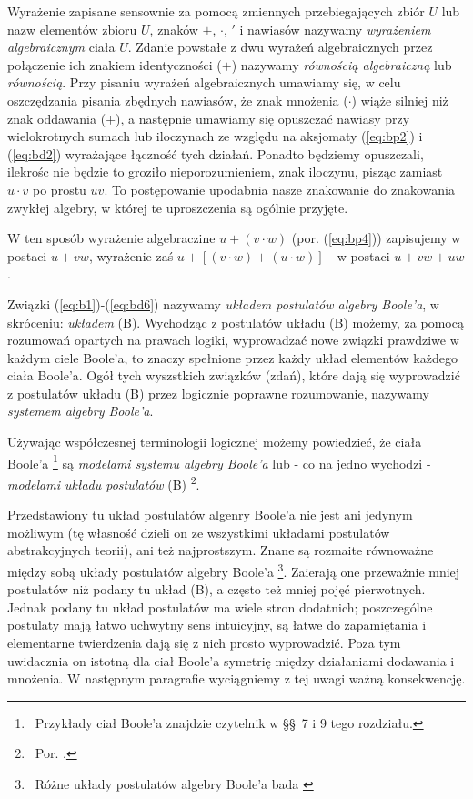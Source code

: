 \documentclass[12 pt, a4paper, leqno]{book}
\numberwithin{equation}{section}
\newcommand{\refb}[1]{(\ref{#1})}
\theoremstyle{twr}
\theoremstyle{twr}
\theoremstyle{eqtext}
\theoremstyle{okreslenie}
\begin{document}
Wyrażenie zapisane sensownie za pomocą zmiennych przebiegających zbiór $U$ lub nazw elementów zbioru $U$, znaków $+$, $\cdot$, 
$'$ i nawiasów nazywamy \textit{wyrażeniem algebraicznym} ciała $U$. Zdanie powstałe z dwu wyrażeń algebraicznych
przez połączenie ich znakiem identyczności ($+$) nazywamy \textit{równością algebraiczną} lub \textit{równością}.
Przy pisaniu wyrażeń algebraicznych umawiamy się, w celu oszczędzania pisania zbędnych nawiasów, 
że znak mnożenia ($\cdot$) wiąże silniej niż znak oddawania ($+$), a następnie umawiamy się opuszczać nawiasy 
przy wielokrotnych sumach lub iloczynach ze względu na aksjomaty \refb{eq:bp2} i \refb{eq:bd2} wyrażające łączność tych działań.
Ponadto będziemy opuszczali, ilekrośc nie będzie to groziło nieporozumieniem, znak iloczynu, pisząc zamiast $u \cdot v$
po prostu $uv$. To postępowanie upodabnia nasze znakowanie do znakowania zwykłej algebry, w której te uproszczenia 
są ogólnie przyjęte.

W ten sposób wyrażenie algebraczine $u +(v \cdot w)$ (por. \refb{eq:bp4}) zapisujemy w postaci $u+vw$, wyrażenie zaś
$u+[(v \cdot w)+(u \cdot w)]$ - w postaci $u + vw + uw$.

Związki \refb{eq:b1}-\refb{eq:bd6} nazywamy \textit{układem postulatów algebry Boole'a}, w skróceniu: \textit{układem} (B).
Wychodząc z postulatów układu (B) możemy, za pomocą rozumowań opartych na prawach logiki, wyprowadzać nowe związki prawdziwe w każdym ciele Boole'a, to znaczy spełnione
przez każdy układ elementów każdego ciała Boole'a. Ogół tych wyszstkich związków (zdań), które dają się wyprowadzić
z postulatów układu (B) przez logicznie poprawne rozumowanie, nazywamy \textit{systemem algebry Boole'a}.

Używając współczesnej terminologii logicznej możemy powiedzieć, że ciała Boole'a \footnote{\ Przykłady ciał Boole'a znajdzie czytelnik w \S\S\ 7 i 9 tego rozdziału.} są 
\textit{modelami systemu algebry Boole'a} lub - co na jedno wychodzi - \textit{modelami układu postulatów} (B) \footnote{\ Por. \cite{tarski1}.}.

Przedstawiony tu układ postulatów algenry Boole'a nie jest ani jedynym możliwym (tę własność dzieli on
ze wszystkimi układami postulatów abstrakcyjnych teorii), ani też najprostszym. Znane są rozmaite równoważne
między sobą układy postulatów algebry Boole'a \footnote{\ Różne układy postulatów algebry Boole'a bada \cite{huntington1}}. Zaierają one przeważnie mniej postulatów niż
podany tu układ (B), a często też mniej pojęć pierwotnych. Jednak podany tu układ postulatów ma wiele stron dodatnich;
poszczególne postulaty mają łatwo uchwytny sens intuicyjny, są łatwe do zapamiętania i elementarne twierdzenia dają się z nich 
prosto wyprowadzić. Poza tym uwidacznia on istotną dla ciał Boole'a symetrię między działaniami dodawania i mnożenia. 
W następnym paragrafie wyciągniemy z tej uwagi ważną konsekwencję.
\end{document}

